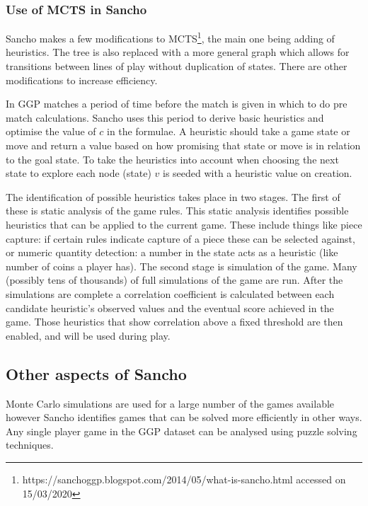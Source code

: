 \subsubsection{Use of MCTS in Sancho}

Sancho makes a few modifications to MCTS\footnote{https://sanchoggp.blogspot.com/2014/05/what-is-sancho.html accessed on 15/03/2020}, the main one being adding of heuristics. The tree is also replaced with a more general graph which allows for transitions between lines of play without duplication of states. There are other modifications to increase efficiency.

In GGP matches a period of time before the match is given in which to do pre match calculations. Sancho uses this period to derive basic heuristics and optimise the value of $c$ in the formulae. A heuristic should take a game state or move and return a value based on how promising that state or move is in relation to the goal state. To take the heuristics into account when choosing the next state to explore each node (state) $v$ is seeded with a heuristic value on creation.

The identification of possible heuristics takes place in two stages. The first of these is static analysis of the game rules. This static analysis identifies possible heuristics that can be applied to the current game. These include things like piece capture: if certain rules indicate capture of a piece these can be selected against, or numeric quantity detection: a number in the state acts as a heuristic (like number of coins a player has). The second stage is simulation of the game. Many (possibly tens of thousands) of full simulations of the game are run. After the simulations are complete a correlation coefficient is calculated between each candidate heuristic's observed values and the eventual score achieved in the game. Those heuristics that show correlation above a fixed threshold are then enabled, and will be used during play.

\subsection{Other aspects of Sancho}

Monte Carlo simulations are used for a large number of the games available however Sancho identifies games that can be solved more efficiently in other ways. Any single player game in the GGP dataset can be analysed using puzzle solving techniques.
